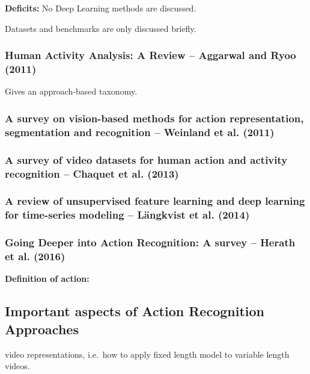 \textbf{Deficits:} No Deep Learning methods are discussed.

Datasets and benchmarks are only discussed briefly.

\subsubsection{Human Activity Analysis: A Review -- Aggarwal and Ryoo (2011)}

Gives an approach-based taxonomy.

\subsubsection{A survey on vision-based methods for action representation, segmentation and recognition -- Weinland et al. (2011)}

\subsubsection{A survey of video datasets for human action and activity recognition -- Chaquet et al. (2013)}

\subsubsection{A review of unsupervised feature learning and deep learning for time-series modeling -- Längkvist et al. (2014)}

\subsubsection{Going Deeper into Action Recognition: A survey -- Herath et al. (2016)}

\textbf{Definition of action:} 

\subsection{Important aspects of Action Recognition Approaches}
video representations, i.e.\ how to apply fixed length model to variable length videos.
